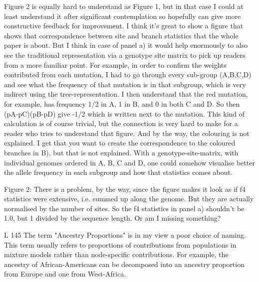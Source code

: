 \begin{point}{}
Figure 2 is equally hard to understand as Figure 1, but in that case I could at least understand it after significant contemplation so hopefully can give more constructive feedback for improvement. I think it's great to show a figure that shows that correspondence between site and branch statistics that the whole paper is about. But I think in case of panel a) it would help enormously to also see the traditional representation via a genotype site matrix to pick up readers from a more familiar point. For example, in order to confirm the weights contributed from each mutation, I had to go through every sub-group (A,B,C,D) and see what the frequency of that mutation is in that subgroup, which is very indirect using the tree-representation. I then understand that the red mutation, for example, has frequency 1/2 in A, 1 in B, and 0 in both C and D. So then (pA-pC)(pB-pD) give -1/2 which is written next to the mutation. This kind of calculation is of course trivial, but the connection is very hard to make for a reader who tries to understand that figure. And by the way, the colouring is not explained. I get that you want to create the correspondence to the coloured branches in B), but that is not explained. With a genotype-site-matrix, with individual genomes ordered in A, B, C and D, one could somehow visualise better the allele frequency in each subgroup and how that statistics comes about.
\end{point}

\reply{
}

\begin{point}{Figure 2:}
There is a problem, by the way, since the figure makes it look as if f4 statistics were extensive, i.e. summed up along the genome. But they are actually normalised by the number of sites. So the f4 statistics in panel a) shouldn't be 1.0, but 1 divided by the sequence length. Or am I missing something?
\end{point}

\reply{
}



\begin{point}{L 145}
        The term "Ancestry Proportions" is in my view a poor choice of naming. This term usually refers to proportions of contributions from populations in mixture models rather than node-specific contributions. For example, the ancestry of African-Americans can be decomposed into an ancestry proportion from Europe and one from West-Africa.
\end{point}

